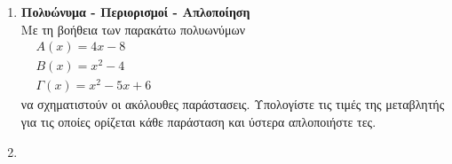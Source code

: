 \documentclass{askhseis}
\begin{document}
\begin{enumerate}
\item \textbf{Πολυώνυμα - Περιορισμοί - Απλοποίηση}\\
Με τη βοήθεια των παρακάτω πολυωνύμων\\
$ \begin{aligned}
& A(x)=4x-8\\& B(x)=x^2-4\\& \varGamma(x)=x^2-5x+6
\end{aligned} $\\
να σχηματιστούν οι ακόλουθες παράστασεις. Υπολογίστε τις τιμές της μεταβλητής για τις οποίες ορίζεται κάθε παράσταση και ύστερα απλοποιήστε τες.
\begin{multicols}{2}
\end{multicols}
\item \textbf{}
\end{enumerate}
\end{document}
